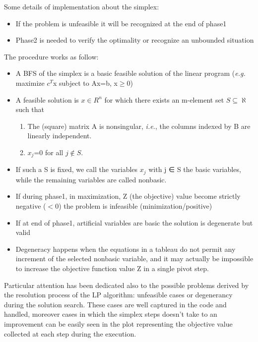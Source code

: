 ﻿\documentclass[a4paper]{article}
\begin{document}
\noindent
Some details of implementation about the simplex:
\begin{itemize}
\item If the problem is unfeasible it will be recognized at the end of phase1
\item Phase2 is needed to verify the optimality or recognize an unbounded situation
\end{itemize}
The procedure works as follow:
\begin{itemize}
\item A BFS of the simplex is a basic feasible solution of the linear program (\textit{e.g.} maximize $c^T$x subject to Ax=b, x$\geq$0)
\item A feasible solution is $x \in R^n$ for which there exists an m-element set $S \subseteq \aleph$ such that
\begin{enumerate}
\item The (square) matrix A is nonsingular, \textit{i.e.}, the columns indexed by B are linearly independent.
\item $x_j$=0 for all $j \notin S$.
\end{enumerate}
\item If such a S is fixed, we call the variables $x_j$ with j ∈ S the basic variables, while the remaining variables are called nonbasic.
\item If during phase1, in maximization, Z (the objective) value become strictly negative ($<0$) the problem is infeasible (minimization/positive)
\item If at end of phase1, artificial variables are basic the solution is degenerate but valid
\item Degeneracy happens when the equations in a tableau do not permit any increment of the selected nonbasic variable,
and it may actually be impossible to increase the objective function value Z in a single pivot step.
\end{itemize}
\noindent
Particular attention has been dedicated also to the possible problems derived by the resolution process of the LP algorithm:  unfeasible cases or degenerancy during the solution search. These cases are well captured in the code and handled, moreover cases in which the simplex steps doesn't take to an improvement can be easily seen in the plot representing the objective value collected at each step during the execution.
\end{document}
